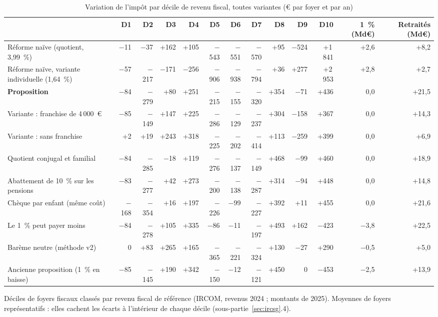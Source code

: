 \documentclass[11pt,a4paper]{article}
\begin{document}
\begin{table}[!htbp]\centering\scriptsize\setlength{\tabcolsep}{3pt}
\caption{Variation de l'impôt par décile de revenu fiscal, toutes variantes (€ par foyer et par an)}\label{tab:ircsg_dec}
{%
\begin{tabular}{@{}lrrrrrrrrrrrr@{}}
\toprule
& D1 & D2 & D3 & D4 & D5 & D6 & D7 & D8 & D9 & D10 & 1~\% (Md€) & Retraités (Md€) \\
\midrule
Réforme naïve (quotient, 3,99~\%) & $-$11 & $-$37 & +162 & +105 & $-$543 & $-$551 & $-$570 & +95 & $-$524 & +1\,841 & +2,6 & +8,2 \\
Réforme naïve, variante individuelle (1,64~\%) & $-$57 & $-$217 & $-$171 & $-$256 & $-$906 & $-$938 & $-$794 & +36 & +277 & +2\,953 & +2,8 & +2,7 \\
\textbf{Proposition} & $-$84 & $-$279 & +80 & +251 & $-$215 & $-$155 & $-$320 & +354 & $-$71 & +436 & 0,0 & +21,5 \\
Variante : franchise de 4\,000~€ & $-$85 & $-$149 & +147 & +225 & $-$286 & $-$129 & $-$237 & +304 & $-$158 & +367 & 0,0 & +14,3 \\
Variante : sans franchise & +2 & +19 & +243 & +318 & $-$225 & $-$202 & $-$414 & +113 & $-$259 & +399 & 0,0 & +6,9 \\
Quotient conjugal et familial & $-$84 & $-$285 & $-$18 & +119 & $-$276 & $-$137 & $-$149 & +468 & $-$99 & +460 & 0,0 & +18,9 \\
Abattement de 10~\% sur les pensions & $-$83 & $-$277 & +42 & +273 & $-$200 & $-$138 & $-$287 & +314 & $-$94 & +448 & 0,0 & +14,8 \\
Chèque par enfant (même coût) & $-$168 & $-$354 & +16 & +197 & $-$226 & $-$99 & $-$227 & +392 & +11 & +455 & 0,0 & +21,6 \\
Le 1~\% peut payer moins & $-$84 & $-$278 & +105 & +335 & $-$86 & $-$11 & $-$197 & +493 & +162 & $-$423 & $-$3,8 & +22,5 \\
Barème neutre (méthode v2) & 0 & +83 & +265 & +165 & $-$365 & $-$221 & $-$324 & +130 & $-$27 & +290 & $-$0,5 & +5,0 \\
Ancienne proposition (1~\% en baisse) & $-$85 & $-$145 & +190 & +342 & $-$150 & $-$12 & $-$121 & +450 & 0 & $-$453 & $-$2,5 & +13,9 \\
\bottomrule
\end{tabular}}
\par\vspace{3pt}\parbox{\linewidth}{\raggedright\scriptsize\color{encre}
Déciles de foyers fiscaux classés par revenu fiscal de référence (IRCOM, revenus 2024 ; montants de 2025). Moyennes de foyers représentatifs : elles cachent les écarts à l'intérieur de chaque décile (sous-partie~\ref{sec:ircsg}.4).}
\end{table}
\end{document}
